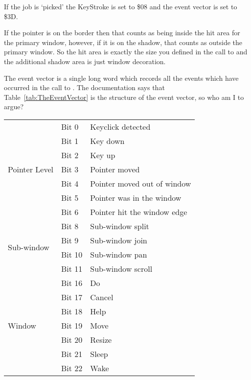 If the job is `picked' the KeyStroke is set to \$08 and the event vector is set to
\$3D.

If the pointer is on the border then that counts as being inside the hit area for the primary 
window, however, if it is on the shadow, that counts as outside the primary window. So the
hit area is exactly the size you defined in the call to  and the additional shadow
area is just window decoration.

The event vector is a single long word which records all the events which have occurred in 
the call to . The documentation says that Table~\ref{tab:TheEventVector} is the structure of the event vector, so who am I to argue?

\begin{table}[htbp]
\centering
\begin{tabular}{l l p{}}
\toprule
%
\multirow{7}{*}{Pointer Level} & Bit 0 & Keyclick detected \\
 & Bit 1 & Key down \\
 & Bit 2 & Key up \\
 & Bit 3 & Pointer moved \\
 & Bit 4 & Pointer moved out of window \\
 & Bit 5 & Pointer was in the window \\
 & Bit 6 & Pointer hit the window edge \\
\midrule

\multirow{4}{*}{Sub-window} & Bit 8 & Sub-window split \\
 & Bit 9 & Sub-window join \\
 & Bit 10 & Sub-window pan \\
 & Bit 11 & Sub-window scroll \\
\midrule

\multirow{7}{*}{Window} & Bit 16 & Do \\
 & Bit 17 & Cancel \\
 & Bit 18 & Help \\
 & Bit 19 & Move \\
 & Bit 20 & Resize \\
 & Bit 21 & Sleep \\
 & Bit 22 & Wake \\
\midrule


\end{tabular}
\end{table}

